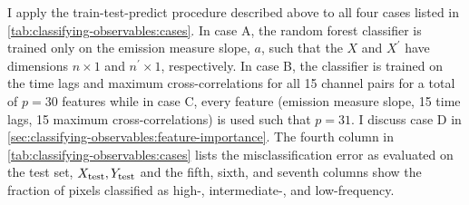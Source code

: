 I apply the train-test-predict procedure described above to all four cases listed in \autoref{tab:classifying-observables:cases}. In case A, the random forest classifier is trained only on the emission measure slope, $a$, such that the $X$ and $X^\prime$ have dimensions $n\times1$ and $n^\prime\times1$, respectively. In case B, the classifier is trained on the time lags and maximum cross-correlations for all 15 channel pairs for a total of $p=30$ features while in case C, every feature (emission measure slope, 15 time lags, 15 maximum cross-correlations) is used such that $p=31$. I discuss case D in \autoref{sec:classifying-observables:feature-importance}. The fourth column in \autoref{tab:classifying-observables:cases} lists the misclassification error as evaluated on the test set, $X_\textup{test},Y_\textup{test}$ and the fifth, sixth, and seventh columns show the fraction of pixels classified as high-, intermediate-, and low-frequency.

